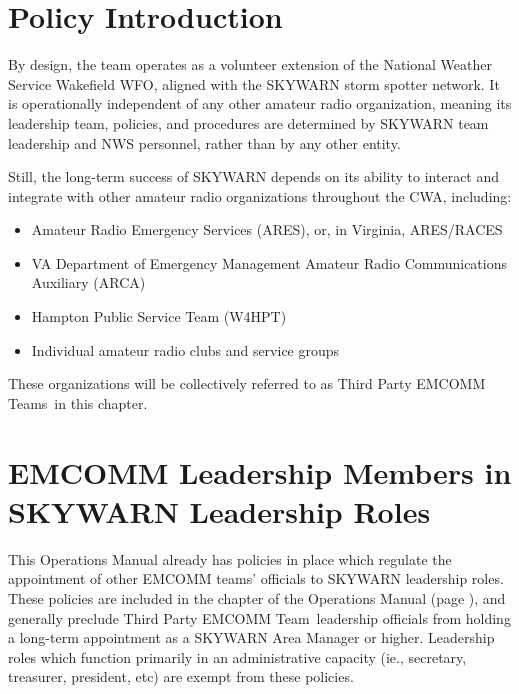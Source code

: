 \documentclass[pdflatex,letterpaper,twoside,12pt]{book}
\begin{document}
\newcommand{\tpteam}{Third Party EMCOMM Team\ }

\newcommand{\tpteams}{Third Party EMCOMM Teams\ }

\section{Policy Introduction}

By design, the team operates as a volunteer extension of the National Weather Service Wakefield WFO, aligned with the SKYWARN storm spotter network.  It is operationally independent of any other amateur radio organization, meaning its leadership team, policies, and procedures are determined by SKYWARN team leadership and NWS personnel, rather than by any other entity.

Still, the long-term success of SKYWARN depends on its ability to interact and integrate with other amateur radio organizations throughout the CWA, including:

\begin{itemize}
\item Amateur Radio Emergency Services (ARES), or, in Virginia, ARES/RACES
\item VA Department of Emergency Management Amateur Radio Communications Auxiliary (ARCA)
\item Hampton Public Service Team (W4HPT)
\item Individual amateur radio clubs and service groups
\end{itemize}

These organizations will be collectively referred to as \tpteams in this chapter.


\section{EMCOMM Leadership Members in SKYWARN Leadership Roles}

This Operations Manual already has policies in place which regulate the appointment of other EMCOMM teams' officials to SKYWARN leadership roles.  These policies are included in the  chapter of the Operations Manual (page \pageref{skywarn-roles}), and generally preclude \tpteam leadership officials from holding a long-term appointment as a SKYWARN Area Manager or higher.  Leadership roles which function primarily in an administrative capacity (ie., secretary, treasurer, president, etc) are exempt from these policies.
\end{document}
